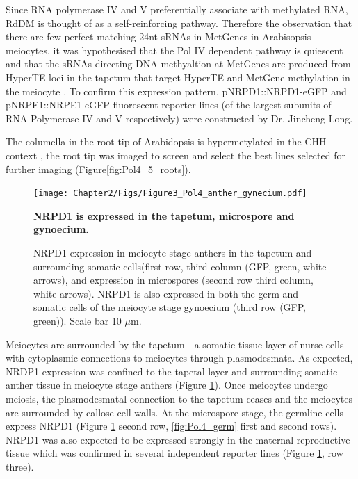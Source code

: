 Since RNA polymerase IV and V preferentially associate with methylated RNA, RdDM is thought of as a self-reinforcing pathway. Therefore the observation that there are few perfect matching 24nt sRNAs in MetGenes in Arabisopsis meiocytes, it was hypothesised that the Pol IV dependent pathway is quiescent and that the sRNAs directing DNA methyaltion at MetGenes are produced from HyperTE loci in the tapetum that target HyperTE and MetGene methylation in the meiocyte \citep{RN199,RN187}. To confirm this expression pattern, pNRPD1::NRPD1-eGFP and pNRPE1::NRPE1-eGFP fluorescent reporter lines (of the largest subunits of RNA Polymerase IV and V respectively\citep{RN33}) were constructed by Dr. Jincheng Long.

The columella in the root tip of Arabidopsis is hypermetylated in the CHH context \citep{RN261}, the root tip was imaged to screen and select the best lines selected for further imaging (Figure\ref{fig:Pol4_5_roots}).

\begin{figure}[htbp!] 
\centering    
    \texttt{[image: Chapter2/Figs/Figure3\_Pol4\_anther\_gynecium.pdf]}
\caption{\textbf{NRPD1 is expressed in the tapetum, microspore and gynoecium.}}
\label{fig:Pol4_anther}
\captionsetup{font=small}
    \caption*{NRPD1 expression in meiocyte stage anthers in the tapetum and surrounding somatic cells(first row, third column (GFP, green, white arrows), and expression in microspores (second row third column, white arrows). NRPD1 is also expressed in both the germ and somatic cells of the meiocyte stage gynoecium (third row (GFP, green)). Scale bar 10 $\mu$m.}
\end{figure}

Meiocytes are surrounded by the tapetum - a somatic tissue layer of nurse cells with cytoplasmic connections to meiocytes through plasmodesmata. As expected, NRDP1 expression was confined to the tapetal layer and surrounding somatic anther tissue in meiocyte stage anthers (Figure \ref{fig:Pol4_anther}). Once meiocytes undergo meiosis, the plasmodesmatal connection to the tapetum ceases and the meiocytes are surrounded by callose cell walls. At the microspore stage, the germline cells express NRPD1 (Figure \ref{fig:Pol4_anther} second row, \ref{fig:Pol4_germ} first and second rows). NRPD1 was also expected to be expressed strongly in the maternal reproductive tissue \citep{RN165} which was confirmed in several independent reporter lines (Figure \ref{fig:Pol4_anther}, row three).

